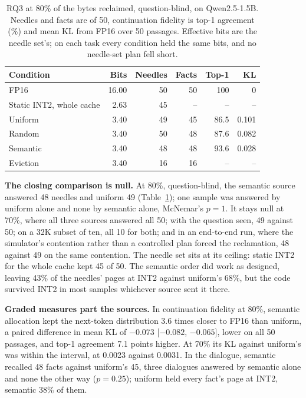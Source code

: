 \documentclass{article}
\begin{document}
\begin{table}[t]
\caption{RQ3 at 80\% of the bytes reclaimed, question-blind, on Qwen2.5-1.5B.
Needles and facts are of 50, continuation fidelity is top-1 agreement (\%) and
mean KL from FP16 over 50 passages. Effective bits are the needle set's; on
each task every condition held the same bits, and no needle-set plan fell
short.}
\label{tab:rq3}
\centering
\small
\begin{tabular}{lrrrrr}
\toprule
Condition & Bits & Needles & Facts & Top-1 & KL \\
\midrule
FP16 & 16.00 & 50 & 50 & 100 & 0 \\
Static INT2, whole cache & 2.63 & 45 & -- & -- & -- \\
Uniform & 3.40 & 49 & 45 & 86.5 & 0.101 \\
Random & 3.40 & 50 & 48 & 87.6 & 0.082 \\
Semantic & 3.40 & 48 & 48 & 93.6 & 0.028 \\
Eviction & 3.40 & 16 & 16 & -- & -- \\
\bottomrule
\end{tabular}
\end{table}

\textbf{The closing comparison is null.} At 80\%, question-blind, the semantic
source answered 48 needles and uniform 49 (Table~\ref{tab:rq3}); one sample was
answered by uniform alone and none by semantic alone, McNemar's $p = 1$. It
stays null at 70\%, where all three sources answered all 50; with the question
seen, 49 against 50; on a 32K subset of ten, all 10 for both; and in an
end-to-end run, where the simulator's contention rather than a controlled
plan forced the reclamation, 48 against 49 on the same contention. The needle set sits at its
ceiling: static INT2 for the whole cache kept 45 of 50. The semantic order did
work as designed, leaving 43\% of the needles' pages at INT2 against uniform's
68\%, but the code survived INT2 in most samples whichever source sent it
there.

\textbf{Graded measures part the sources.} In continuation fidelity at 80\%,
semantic allocation kept the next-token distribution 3.6 times closer to FP16
than uniform, a paired difference in mean KL of $-0.073$ [$-0.082$,
$-0.065$], lower on all 50 passages, and top-1 agreement 7.1 points higher.
At 70\% its KL against uniform's was within the interval, at 0.0023 against
0.0031. In the dialogue, semantic recalled 48 facts against uniform's 45, three
dialogues answered by semantic alone and none the other way ($p = 0.25$);
uniform held every fact's page at INT2, semantic 38\% of them.
\end{document}
